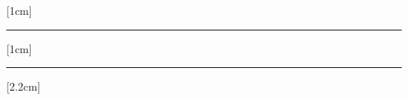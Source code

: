 \usepackage{graphicx}
\usepackage{xcolor}
\usepackage{mathptmx}
\usepackage{titletoc}
\usepackage[top=2cm, left=2cm, right=2cm, bottom=2cm]{geometry}
\usepackage{fancyhdr}
\usepackage{amsthm}
\usepackage{titlesec}

\graphicspath{{Images/}}



\contentsmargin{0cm}

[1cm]
{\vspace{20pt}\large\bfseries}  %
{\color{blue}\contentslabel[\Large\thecontentslabel]{1cm}\color{red}} %
{\color{green}}  %
{\color{red}\hrule} %

[1cm]
{\vspace{20pt}\large\bfseries}  %
{\color{blue}\contentslabel[\Large\thecontentslabel]{1cm}\color{red}} %
{\color{green}}  %
{\color{red}\hrule} %

[2.2cm]
{\vspace{2pt}}  %
{\color{black}\contentslabel[\Large\thecontentslabel]{1cm}\color{black}} %
{}
{\thecontentspage} %









\newtheorem{prblm}{Problem}
\newtheorem{defn}{Definition}
